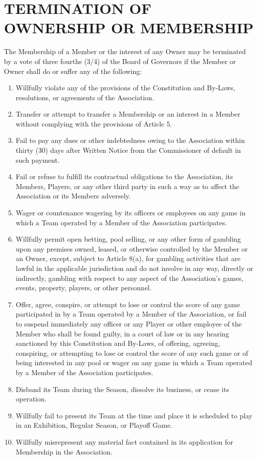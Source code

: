 \documentclass[]{book}
\providecommand{\tightlist}{%
  \setlength{\itemsep}{0pt}\setlength{\parskip}{0pt}}
\theoremstyle{definition}
\theoremstyle{definition}
\theoremstyle{definition}
\theoremstyle{remark}
\begin{document}
\section{TERMINATION OF OWNERSHIP OR
MEMBERSHIP}\label{termination-of-ownership-or-membership}

The Membership of a Member or the interest of any Owner may be
terminated by a vote of three fourths (3/4) of the Board of Governors if
the Member or Owner shall do or suffer any of the following:

\begin{enumerate}
\def\labelenumi{(\alph{enumi})}
\tightlist
\item
  Willfully violate any of the provisions of the Constitution and
  By-Laws, resolutions, or agreements of the Association.
\item
  Transfer or attempt to transfer a Membership or an interest in a
  Member without complying with the provisions of Article 5.
\item
  Fail to pay any dues or other indebtedness owing to the Association
  within thirty (30) days after Written Notice from the Commissioner of
  default in such payment.
\item
  Fail or refuse to fulfill its contractual obligations to the
  Association, its Members, Players, or any other third party in such a
  way as to affect the Association or its Members adversely.
\item
  Wager or countenance wagering by its officers or employees on any game
  in which a Team operated by a Member of the Association participates.
\item
  Willfully permit open betting, pool selling, or any other form of
  gambling upon any premises owned, leased, or otherwise controlled by
  the Member or an Owner, except, subject to Article 8(a), for gambling
  activities that are lawful in the applicable jurisdiction and do not
  involve in any way, directly or indirectly, gambling with respect to
  any aspect of the Association's games, events, property, players, or
  other personnel.
\item
  Offer, agree, conspire, or attempt to lose or control the score of any
  game participated in by a Team operated by a Member of the
  Association, or fail to suspend immediately any officer or any Player
  or other employee of the Member who shall be found guilty, in a court
  of law or in any hearing sanctioned by this Constitution and By-Laws,
  of offering, agreeing, conspiring, or attempting to lose or control
  the score of any such game or of being interested in any pool or wager
  on any game in which a Team operated by a Member of the Association
  participates.
\item
  Disband its Team during the Season, dissolve its business, or cease
  its operation.
\item
  Willfully fail to present its Team at the time and place it is
  scheduled to play in an Exhibition, Regular Season, or Playoff Game.
\item
  Willfully misrepresent any material fact contained in its application
  for Membership in the Association.
\end{enumerate}
\end{document}
